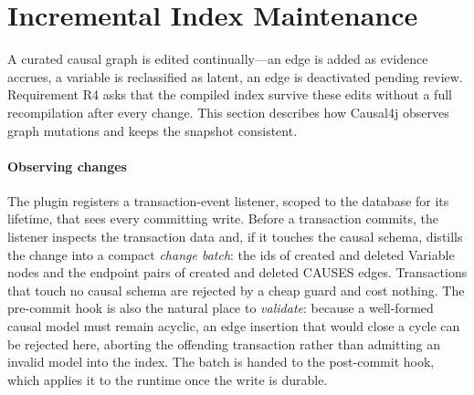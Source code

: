 \section{Incremental Index Maintenance}\label{sec:incr}

A curated causal graph is edited continually---an edge is added as evidence
accrues, a variable is reclassified as latent, an edge is deactivated pending
review. Requirement R4 asks that the compiled index survive these edits without
a full recompilation after every change. This section describes how Causal4j
observes graph mutations and keeps the snapshot consistent.

\paragraph{Observing changes}
The plugin registers a transaction-event listener, scoped to the database for its
lifetime, that sees every committing write. Before a transaction commits, the
listener inspects the transaction data and, if it touches the causal schema,
distills the change into a compact \emph{change batch}: the ids of created and
deleted \textsf{Variable} nodes and the endpoint pairs of created and deleted
\textsf{CAUSES} edges. Transactions that touch no causal schema are rejected by a
cheap guard and cost nothing. The pre-commit hook is also the natural place to
\emph{validate}: because a well-formed causal model must remain acyclic, an edge
insertion that would close a cycle can be rejected here, aborting the offending
transaction rather than admitting an invalid model into the index. The batch is
handed to the post-commit hook, which applies it to the runtime once the write is
durable.

